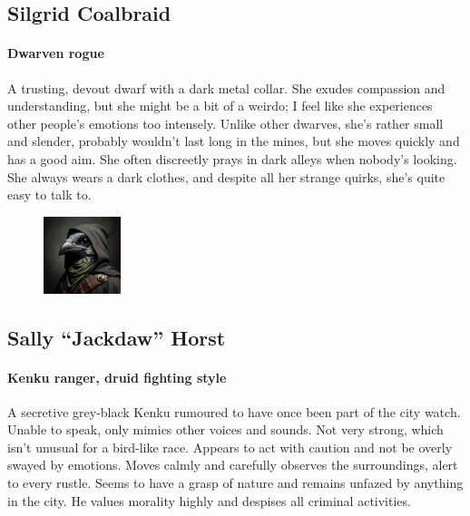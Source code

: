 \documentclass[10pt,twocolumn,twoside,openany,bg=full,layout=true,nomultitoc]{dndbook}
\begin{document}
  \subsection{Silgrid Coalbraid}\label{subsec:silgrid-coalbraid}

  \paragraph{Dwarven rogue} A trusting, devout dwarf with a dark metal collar.
  She exudes compassion and understanding, but she might be a bit of a weirdo; I feel like she experiences other
  people's emotions too intensely.
  Unlike other dwarves, she's rather small and slender, probably wouldn't last long
  in the mines, but she moves quickly and has a good aim.
  She often discreetly prays in dark alleys when nobody's looking.
  She always wears a dark clothes, and despite all her strange quirks, she's quite easy to talk to.


  \begin{figure}
    \begin{center}
      \includegraphics[width=0.2\textwidth]{img/sally}
    \end{center}
  \end{figure}
  \subsection{Sally “Jackdaw” Horst}\label{subsec:sally-jackdaw-horst}

  \paragraph{Kenku ranger, druid fighting style}
  A secretive grey-black Kenku rumoured to have once been part of the city watch.
  Unable to speak, only mimics other voices and sounds.
  Not very strong, which isn't unusual for a bird-like race.
  Appears to act with caution and not be overly swayed by emotions.
  Moves calmly and carefully observes the surroundings, alert to every rustle.
  Seems to have a grasp of nature and remains unfazed by anything in the city.
  He values morality highly and despises all criminal activities.
\end{document}
